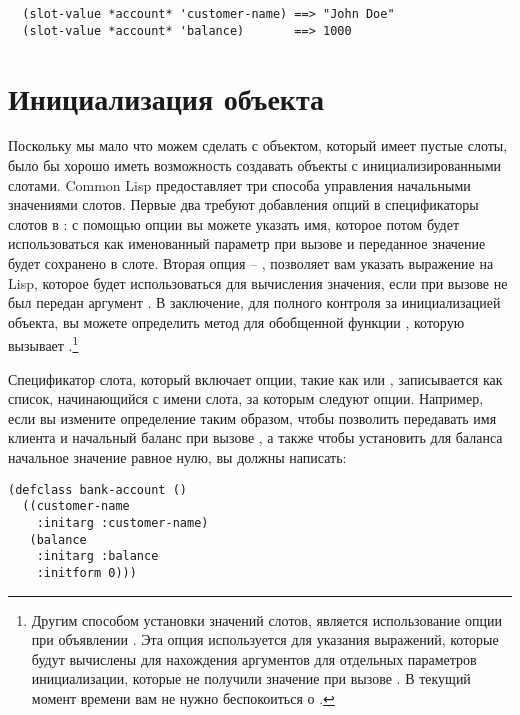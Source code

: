 \begin{verbatim}
  (slot-value *account* 'customer-name) ==> "John Doe"
  (slot-value *account* 'balance)       ==> 1000
\end{verbatim}

\section{Инициализация объекта}

Поскольку мы мало что можем сделать с объектом, который имеет пустые слоты, было бы хорошо
иметь возможность создавать объекты с инициализированными слотами.  Common Lisp
предоставляет три способа управления начальными значениями слотов.  Первые два требуют
добавления опций в спецификаторы слотов в : с помощью опции 
вы можете указать имя, которое потом будет использоваться как именованный параметр при
вызове  и переданное значение будет сохранено в слоте.  Вторая опция
-- , позволяет вам указать выражение на Lisp, которое будет использоваться
для вычисления значения, если при вызове  не был передан аргумент
 .  В заключение, для полного контроля за инициализацией объекта, вы можете
определить метод для обобщенной функции , которую вызывает
.\footnote{Другим способом установки значений слотов, является
  использование опции  при объявлении .  Эта опция
  используется для указания выражений, которые будут вычислены для нахождения аргументов
  для отдельных параметров инициализации, которые не получили значение при вызове
  .  В текущий момент времени вам не нужно беспокоиться о
  .}

Спецификатор слота, который включает опции, такие как  или
, записывается как список, начинающийся с имени слота, за которым следуют
опции.  Например, если вы измените определение  таким образом, чтобы
позволить передавать имя клиента и начальный баланс при вызове , а
также чтобы установить для баланса начальное значение равное нулю, вы должны написать:

\begin{lstlisting}
(defclass bank-account ()
  ((customer-name
    :initarg :customer-name)
   (balance
    :initarg :balance
    :initform 0)))
\end{lstlisting}

